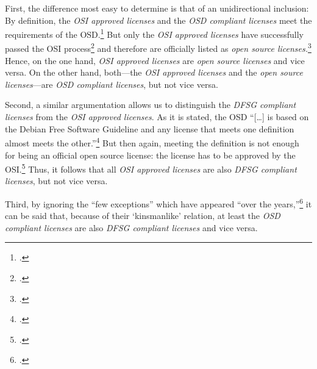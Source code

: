 First, the difference most easy to determine is that of an unidirectional
inclusion: By definition, the \emph{OSI approved licenses} and the \emph{OSD
compliant licenses} meet the requirements of the OSD.\footcite[cf.][\nopage
wp]{OSI2012a} But only the \emph{OSI approved licenses} have successfully
passed the OSI process\footcite[cf.][\nopage wp]{OSI2012a} and therefore are
officially listed as \emph{open source licenses.}\footcite[cf.][\nopage
wp]{OSI2012b}
Hence, on the one hand, \emph{OSI approved licenses} are
\emph{open source licenses} and vice versa. On the other hand, both---the
\emph{OSI approved licenses} and the \emph{open source licenses}---are
\emph{OSD compliant licenses}, but not vice versa.

Second, a similar argumentation allows us to distinguish the \emph{DFSG compliant
licenses} from the \emph{OSI approved licenses}. As it is stated, the OSD
\enquote{[\ldots] is based on the Debian Free Software Guideline and any
license that meets one definition almost meets the
other.}\footcite[cf.][233]{Fogel2006a} But then again, meeting the definition is
not enough for being an official open source license: the license has to be
approved by the OSI.\footcite[cf.][\nopage wp]{OSI2012b} Thus, it follows that
all \emph{OSI approved licenses} are also \emph{DFSG compliant licenses}, but
not vice versa.

Third, by ignoring the \enquote{few exceptions} which have appeared
\enquote{over the years,}\footcite[cf.][233]{Fogel2006a} it can be said that,
because of their `kinsmanlike' relation, at least the \emph{OSD compliant
licenses} are also \emph{DFSG compliant licenses} and vice versa.

